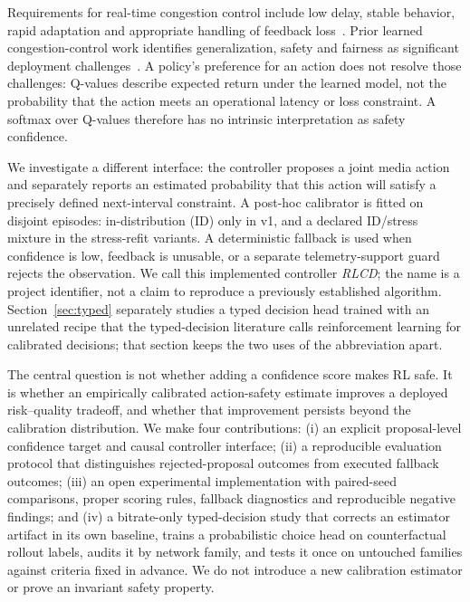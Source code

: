 \documentclass[10pt]{article}
\begin{document}
Requirements for real-time congestion control include low delay, stable behavior, rapid adaptation and appropriate handling of feedback loss~\cite{rfc8836}. Prior learned congestion-control work identifies generalization, safety and fairness as significant deployment challenges~\cite{jay2019aurora}. A policy's preference for an action does not resolve those challenges: Q-values describe expected return under the learned model, not the probability that the action meets an operational latency or loss constraint. A softmax over Q-values therefore has no intrinsic interpretation as safety confidence.

We investigate a different interface: the controller proposes a joint media action and separately reports an estimated probability that this action will satisfy a precisely defined next-interval constraint. A post-hoc calibrator is fitted on disjoint episodes: in-distribution (ID) only in v1, and a declared ID/stress mixture in the stress-refit variants. A deterministic fallback is used when confidence is low, feedback is unusable, or a separate telemetry-support guard rejects the observation. We call this implemented controller \emph{RLCD}; the name is a project identifier, not a claim to reproduce a previously established algorithm. Section~\ref{sec:typed} separately studies a typed decision head trained with an unrelated recipe that the typed-decision literature calls reinforcement learning for calibrated decisions; that section keeps the two uses of the abbreviation apart.

The central question is not whether adding a confidence score makes RL safe. It is whether an empirically calibrated action-safety estimate improves a deployed risk--quality tradeoff, and whether that improvement persists beyond the calibration distribution. We make four contributions: (i) an explicit proposal-level confidence target and causal controller interface; (ii) a reproducible evaluation protocol that distinguishes rejected-proposal outcomes from executed fallback outcomes; (iii) an open experimental implementation with paired-seed comparisons, proper scoring rules, fallback diagnostics and reproducible negative findings; and (iv) a bitrate-only typed-decision study that corrects an estimator artifact in its own baseline, trains a probabilistic choice head on counterfactual rollout labels, audits it by network family, and tests it once on untouched families against criteria fixed in advance. We do not introduce a new calibration estimator or prove an invariant safety property.
\end{document}
